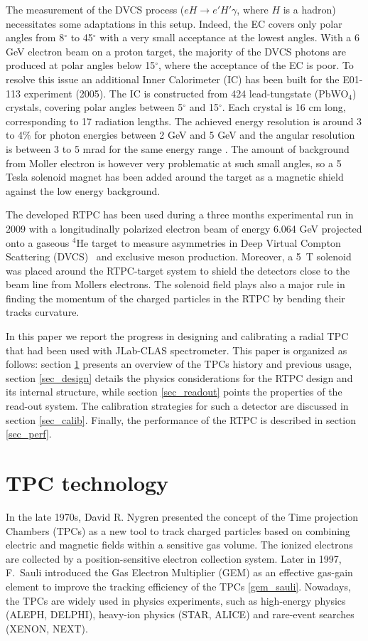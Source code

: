 \documentclass[twocolumn,showpacs,superscriptaddress,groupedaddress]{revtex4}
\begin{document}
The measurement of the DVCS process ($eH \rightarrow e' H' \gamma$, where 
$H$ is a hadron) necessitates some adaptations in this setup. Indeed, the EC 
covers only polar angles from 8$^{\circ}$ to 45$^{\circ}$ with a very small
acceptance at the lowest angles. With a 6 GeV electron beam on a proton target, the 
majority of the DVCS photons are produced at polar angles below 15$^{\circ}$, 
where the acceptance of the EC is poor. To resolve this issue an additional 
Inner Calorimeter (IC) has been built for the E01-113 experiment (2005). The IC is 
constructed from 424 lead-tungstate (PbWO$_{4}$) crystals, covering polar 
angles between 5$^{\circ}$ and 15$^{\circ}$. Each crystal is 16 cm long,
corresponding to 17 radiation lengths. The achieved energy 
resolution is around 3 to 4$\%$ for photon energies between 2 GeV and 5 GeV and 
the angular resolution is between 3 to 5 mrad for the same energy range 
\cite{Hyon-suk}. The amount of background from Moller electron is however
very problematic at such small angles, so a 5 Tesla solenoid magnet has been
added around the target as a magnetic shield against the low energy background.

The developed RTPC has been used during a three months experimental run in 2009 
with a longitudinally polarized electron beam of energy 6.064 GeV projected 
onto a gaseous $^{4}$He target to measure asymmetries in Deep Virtual Compton 
Scattering (DVCS)~\cite{proposal} and exclusive meson production. Moreover, a 
5~T solenoid was placed around the RTPC-target system to shield the detectors 
close to the beam line from Mollers electrons. The solenoid field plays also a 
major rule in finding the momentum of the charged particles in the RTPC by 
bending their tracks curvature.

In this paper we report the progress in designing and calibrating a radial TPC 
that had been used with JLab-CLAS spectrometer. This paper is organized as 
follows: section \ref{prev_tpc} presents an overview of the TPCs history and 
previous usage, section \ref{sec_design} details the physics considerations for 
the RTPC design and its internal structure, while section \ref{sec_readout} 
points the properties of the read-out system. The calibration strategies for 
such a detector are discussed in section \ref{sec_calib}. Finally, the 
performance of the RTPC is described in section \ref{sec_perf}.

\section{TPC technology} \label{prev_tpc}
In the late 1970s, David R. Nygren presented the concept of the Time projection 
Chambers (TPCs) as a new tool to track charged particles based on combining 
electric and magnetic fields within a sensitive gas volume. The ionized 
electrons are collected by a position-sensitive electron collection system.  
Later in 1997, F.~Sauli introduced the Gas Electron Multiplier (GEM) as an 
effective gas-gain element to improve the tracking efficiency of the TPCs 
\ref{gem_sauli}. Nowadays, the TPCs are widely used in physics experiments, 
such as high-energy physics (ALEPH, DELPHI), heavy-ion physics (STAR, ALICE) 
and rare-event searches (XENON, NEXT).
\end{document}

